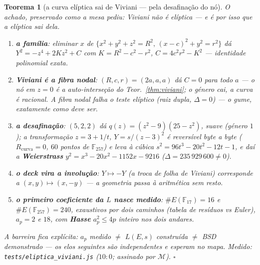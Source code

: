 \documentclass[11pt,a4paper]{article}
\newtheorem{teorema}{Teorema}
\newcommand{\code}[1]{\texttt{\small #1}}
\begin{document}
\begin{teorema}[a curva elíptica sai de Viviani --- pela desafinação
do nó]\label{thm:eliptica}
O achado, preservado como a mesa pediu: \emph{Viviani não é elíptica
--- e é por isso que a elíptica sai dela.}
\begin{enumerate}
\item \textbf{a família}: eliminar $x$ de
$\{x^{2}{+}y^{2}{+}z^{2}{=}R^{2},\,(x{-}c)^{2}{+}y^{2}{=}r^{2}\}$ dá
$Y^{2}=-z^{4}+2Kz^{2}+C$ com $K=R^{2}{-}c^{2}{-}r^{2}$,
$C=4c^{2}r^{2}{-}K^{2}$ --- identidade polinomial exata.
\item \textbf{Viviani é a fibra nodal}: $(R,c,r)=(2a,a,a)$ dá
$C=0$ \emph{para todo} $a$ --- o nó em $z=0$ é a auto-interseção do
Teor.~\ref{thm:viviani}; o género cai, a curva é racional. A fibra
nodal \emph{falha} o teste elíptico (raiz dupla, $\Delta=0$) --- o
gume, exatamente como deve ser.
\item \textbf{a desafinação}: $(5,2,2)$ dá
$q(z)=(z^{2}{-}9)(25{-}z^{2})$, suave (género $1$); a transformação
$z=3+1/t$, $Y=s/(z{-}3)^{2}$ é \emph{reversível byte a byte}
($R_{\text{curva}}=0$, $60$ pontos de $\mathbb{F}_{257}$) e leva à
cúbica $s^{2}=96t^{3}{-}20t^{2}{-}12t{-}1$, e daí a
\textbf{Weierstrass} $y^{2}=x^{3}{-}20x^{2}{-}1152x{-}9216$
($\Delta=235\,929\,600\neq0$).
\item \textbf{o deck vira a involução}: $Y\mapsto-Y$ (a troca de
folha de Viviani) corresponde a $(x,y)\mapsto(x,-y)$ --- a geometria
passa à aritmética sem resto.
\item \textbf{o primeiro coeficiente da $L$ nasce medido}:
$\#E(\mathbb{F}_{17})=16$ e $\#E(\mathbb{F}_{257})=240$, exaustivos
por dois caminhos (tabela de resíduos vs Euler), $a_{p}=2$ e $18$,
com \textbf{Hasse} $a_{p}^{2}\le4p$ inteiro nos dois andares.
\end{enumerate}
A barreira fica explícita: $a_{p}$ \emph{medido} $\neq$ $L(E,s)$
\emph{construída} $\neq$ BSD \emph{demonstrado} --- os elos seguintes
são independentes e esperam no mapa.
\emph{Medido:} \code{tests/eliptica\_viviani.js} ($10{:}0$; assinado
por $\mathcal{M}$).
$\square$
\end{teorema}
\end{document}
